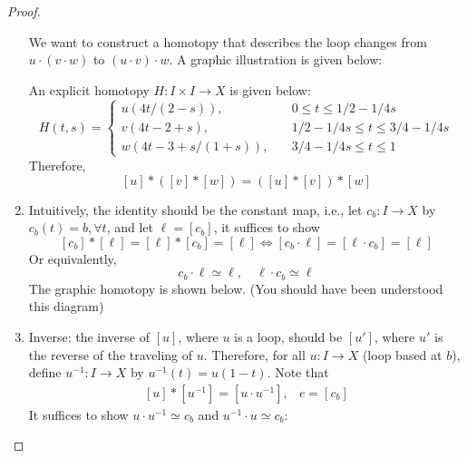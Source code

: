 \begin{proof}
\begin{enumerate}
We want to construct a homotopy that describes the loop changes from $u\cdot(v\cdot w)$ to $(u\cdot v)\cdot w$. A graphic illustration is given below:
\begin{figure}[H]
	\label{Fig:11:8}
\end{figure}
An explicit homotopy $H:I\times I\to X$ is given below:
\[
H(t,s) = \left\{
\begin{aligned}
u(4t/(2-s)),&\quad 0\le t\le 1/2-1/4s\\
v(4t - 2+s),&\quad 1/2 - 1/4s\le t\le 3/4 - 1/4s\\
w(4t - 3+s/(1+s)),&\quad 3/4 - 1/4s\le t\le 1
\end{aligned}
\right.
\]
Therefore,
\[
[u]*([v]*[w])=([u]*[v])*[w]
\]
\item
Intuitively, the identity should be the constant map, i.e., let $c_b:I\to X$ by $c_b(t) = b,\forall t$, and let $\ell = [c_b]$, it suffices to show
\[
[c_b]*[\ell]=[\ell]*[c_b]=[\ell]
\Longleftrightarrow
[c_b\cdot\ell]=[\ell\cdot c_b]=[\ell]
\]
Or equivalently,
\[
c_b\cdot\ell\simeq\ell,\quad
\ell\cdot c_b\simeq \ell
\]
The graphic homotopy is shown below. (You should have been understood this diagram)
\begin{figure}[H]
	\label{Fig:11:9}
\end{figure}
\item
Inverse: the inverse of $[u]$, where $u$ is a loop, should be $[u']$, where $u'$ is the reverse of the traveling of $u$.
Therefore, for all $u:I\to X$ (loop based at $b$), define $u^{-1}:I\to X$ by $u^{-1}(t)=u(1-t)$.
Note that
\[
\begin{array}{ll}
[u]*[u^{-1}]=[u\cdot u^{-1}],
&
e = [c_b] 
\end{array}
\]
It suffices to show $u\cdot u^{-1}\simeq c_b$ and $u^{-1}\cdot u\simeq c_b$:


\end{enumerate}
\end{proof}

